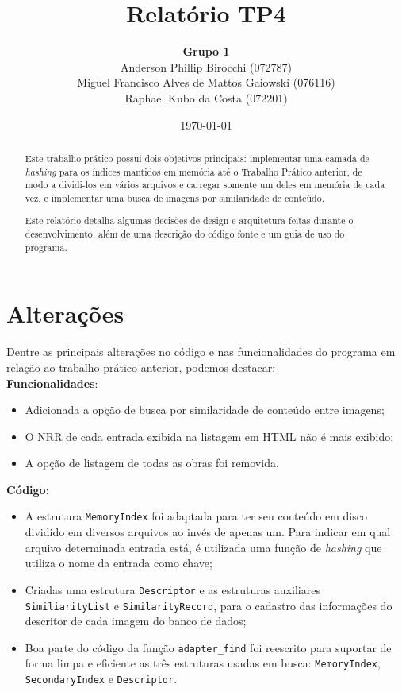 \documentclass[a4paper,10pt]{article}
\title{\textbf{Relatório TP4}}
\author{\textbf{Grupo 1} \\
  Anderson Phillip Birocchi (072787) \\
  Miguel Francisco Alves de Mattos Gaiowski (076116) \\
  Raphael Kubo da Costa (072201)}
\date{\today}
\begin{document}
\maketitle

\begin{abstract}
Este trabalho prático possui dois objetivos principais: implementar uma camada de \textit{hashing} para os índices mantidos em memória até o Trabalho Prático anterior, de modo a dividi-los em vários arquivos e carregar somente um deles em memória de cada vez, e implementar uma busca de imagens por similaridade de conteúdo.

Este relatório detalha algumas decisões de design e arquitetura feitas durante o desenvolvimento, além de uma descrição do código fonte e um guia de uso do programa.
\end{abstract}

\section{Alterações}
Dentre as principais alterações no código e nas funcionalidades do programa em relação ao trabalho prático anterior, podemos destacar:\\

\textbf{Funcionalidades}:
\begin{itemize}
\item Adicionada a opção de busca por similaridade de conteúdo entre imagens;
\item O NRR de cada entrada exibida na listagem em HTML não é mais exibido;
\item A opção de listagem de todas as obras foi removida.
\end{itemize}

\textbf{Código}:
\begin{itemize}
\item A estrutura \texttt{MemoryIndex} foi adaptada para ter seu conteúdo em disco dividido em diversos arquivos ao invés de apenas um. Para indicar em qual arquivo determinada entrada está, é utilizada uma função de \textit{hashing} que utiliza o nome da entrada como chave;
\item Criadas uma estrutura \texttt{Descriptor} e as estruturas auxiliares \texttt{SimiliarityList} e \texttt{SimilarityRecord}, para o cadastro das informações do descritor de cada imagem do banco de dados;
\item Boa parte do código da função \texttt{adapter\_find} foi reescrito para suportar de forma limpa e eficiente as três estruturas usadas em busca: \texttt{MemoryIndex}, \texttt{SecondaryIndex} e \texttt{Descriptor}.
\end{itemize}
\end{document}
